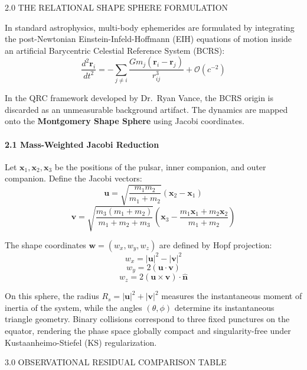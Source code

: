 \documentclass[12pt,twoside,openright]{book}
\newcommand{\sceneheader}[1]{%
  \par\vspace{1.8em}%
  {\noindent\centering\scshape\large #1\par}%
  \vspace{1.0em}%
  \noindent%
}
\newcommand{\dinkus}{%
  \par\vspace{1.2em}%
  {\noindent\centering{\large $\ast\quad\ast\quad\ast$}\par}%
  \vspace{1.2em}%
  \noindent%
}
\begin{document}
\dinkus

\sceneheader{2.0 THE RELATIONAL SHAPE SPHERE
FORMULATION}

In standard astrophysics, multi-body ephemerides are formulated by
integrating the post-Newtonian Einstein-Infeld-Hoffmann (EIH) equations
of motion inside an artificial Barycentric Celestial Reference System
(BCRS):
\[\frac{d^2 \mathbf{r}_i}{dt^2} = - \sum_{j \neq i} \frac{G m_j (\mathbf{r}_i - \mathbf{r}_j)}{r_{ij}^3} + \mathcal{O}(c^{-2})\]

In the QRC framework developed by Dr.~Ryan Vance, the BCRS origin is
discarded as an unmeasurable background artifact. The dynamics are
mapped onto the \textbf{Montgomery Shape Sphere} using Jacobi
coordinates.

\paragraph{2.1 Mass-Weighted Jacobi
Reduction}\label{mass-weighted-jacobi-reduction}

Let \(\mathbf{x}_1, \mathbf{x}_2, \mathbf{x}_3\) be the positions of the
pulsar, inner companion, and outer companion. Define the Jacobi vectors:
\[\mathbf{u} = \sqrt{\frac{m_1 m_2}{m_1 + m_2}} (\mathbf{x}_2 - \mathbf{x}_1)\]
\[\mathbf{v} = \sqrt{\frac{m_3 (m_1 + m_2)}{m_1 + m_2 + m_3}} \left( \mathbf{x}_3 - \frac{m_1 \mathbf{x}_1 + m_2 \mathbf{x}_2}{m_1 + m_2} \right)\]

The shape coordinates \(\mathbf{w} = (w_x, w_y, w_z)\) are defined by
Hopf projection: \[w_x = |\mathbf{u}|^2 - |\mathbf{v}|^2\]
\[w_y = 2 (\mathbf{u} \cdot \mathbf{v})\]
\[w_z = 2 (\mathbf{u} \times \mathbf{v}) \cdot \hat{\mathbf{n}}\]

On this sphere, the radius \(R_s = |\mathbf{u}|^2 + |\mathbf{v}|^2\)
measures the instantaneous moment of inertia of the system, while the
angles \((\theta, \phi)\) determine its instantaneous triangle geometry.
Binary collisions correspond to three fixed punctures on the equator,
rendering the phase space globally compact and singularity-free under
Kustaanheimo-Stiefel (KS) regularization.

\dinkus

\sceneheader{3.0 OBSERVATIONAL RESIDUAL COMPARISON
TABLE}
\end{document}
